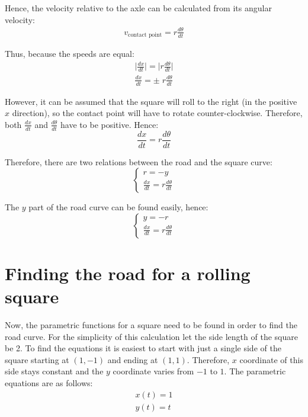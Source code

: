 \documentclass[12pt]{article}
\begin{document}
        Hence, the velocity relative to the axle can be calculated from its angular velocity:
        \begin{align}
            v_{\text{contact point}} = r \frac{d\theta}{dt}
        \end{align}            

        Thus, because the speeds are equal:
        \begin{align}
            \bigl|\frac{dx}{dt}\bigr| = \bigl|r \frac{d\theta}{dt}\bigr| \\
            \frac{dx}{dt} = \pm\; r \frac{d\theta}{dt}
        \end{align}

        However, it can be assumed that the square will roll to the right (in the positive $x$ direction), so the contact point will have to rotate counter-clockwise. Therefore, both $\frac{dx}{dt}$ and $\frac{d\theta}{dt}$ have to be positive. Hence:
        \begin{equation}\label{eq:dxdt}
            \frac{dx}{dt} = r \frac{d\theta}{dt}
        \end{equation}

        Therefore, there are two relations between the road and the square curve:
        \begin{equation}
            \begin{cases}
                r = - y \\
                \frac{dx}{dt} = r \frac{d\theta}{dt}
            \end{cases}
        \end{equation}

        The $y$ part of the road curve can be found easily, hence:
        \begin{equation}\label{eq:road_1}
            \begin{cases}
                y = -r \\
                \frac{dx}{dt} = r \frac{d\theta}{dt}
            \end{cases}
        \end{equation}

    \section{Finding the road for a rolling square}

        Now, the parametric functions for a square need to be found in order to find the road curve. For the simplicity of this calculation let the side length of the square be 2. To find the equations it is easiest to start with just a single side of the square starting at $(1, -1)$ and ending at $(1, 1)$. Therefore, $x$ coordinate of this side stays constant and the $y$ coordinate varies from $-1$ to $1$. The parametric equations are as follows:
        \begin{align}
            x(t) = 1 \\
            y(t) = t
        \end{align}
\end{document}
